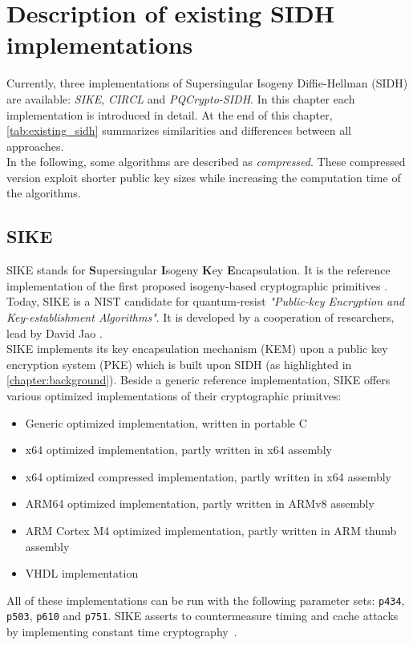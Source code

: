 \chapter{Description of existing SIDH implementations}\label{chapter:existing_sidh}
Currently, three implementations of Supersingular Isogeny Diffie-Hellman (SIDH) are available: \textit{SIKE}, \textit{CIRCL} and \textit{PQCrypto-SIDH}. In this chapter each implementation is introduced in detail. At the end of this chapter, \autoref{tab:existing_sidh} summarizes similarities and differences between all approaches.
\\
In the following, some algorithms are described as \textit{compressed}. These compressed version exploit shorter public key sizes while increasing the computation time of the algorithms.

\section{SIKE}
SIKE stands for \textbf{S}upersingular \textbf{I}sogeny \textbf{K}ey \textbf{E}ncapsulation. It is the reference implementation of the first proposed isogeny-based cryptographic primitives \parencite{jao2011towards}. Today, SIKE is a NIST candidate for quantum-resist \textit{"Public-key Encryption and Key-establishment Algorithms"}. It is developed by a cooperation of researchers, lead by David Jao \parencite{sike2020spec}.
\\
SIKE implements its key encapsulation mechanism (KEM) upon a public key encryption system (PKE) which is built upon SIDH (as highlighted in \autoref{chapter:background}). Beside a generic reference implementation, SIKE offers various optimized implementations of their cryptographic primitves:
\begin{itemize}
  \item Generic optimized implementation, written in portable C
  \item x64 optimized implementation, partly written in x64 assembly
  \item x64 optimized compressed implementation, partly written in x64 assembly
  \item ARM64 optimized implementation, partly written in ARMv8 assembly
  \item ARM Cortex M4 optimized implementation, partly written in ARM thumb assembly
  \item VHDL implementation
\end{itemize}
All of these implementations can be run with the following parameter sets: \texttt{p434}, \texttt{p503}, \texttt{p610} and \texttt{p751}. SIKE asserts to countermeasure timing and cache attacks by implementing constant time cryptography~\parencite{sike2020spec}.

